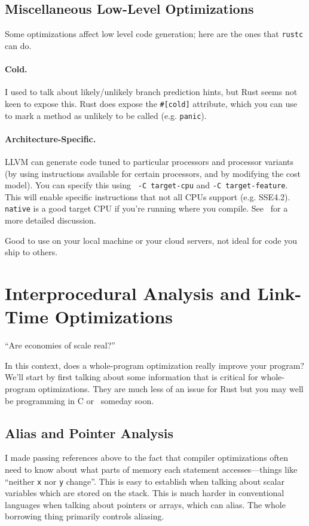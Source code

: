 \subsection*{Miscellaneous Low-Level Optimizations}
Some optimizations affect low level code generation; here are the ones that
{\tt rustc} can do.

\paragraph{Cold.} I used to talk about likely/unlikely branch prediction hints,
but Rust seems not keen to expose this. Rust does expose the \verb+#[cold]+
attribute, which you can use to mark a method as unlikely to be called (e.g. \texttt{panic}).

\paragraph{Architecture-Specific.} LLVM can generate code tuned to particular
processors and processor variants (by using instructions available for certain processors,
and by modifying the cost model). You can specify this using {\tt
  -C target-cpu} and {\tt -C target-feature}.
This will enable specific instructions that not all CPUs support (e.g. SSE4.2).
{\tt native} is a good target CPU if you're running where you compile.
See~\cite{wilcox20:_target_featur_target_cpu_rust}
for a more detailed discussion. 

\noindent
Good to use on your local machine or your cloud servers, not ideal for code you ship to others.


\section*{Interprocedural Analysis and Link-Time Optimizations}
\hfill ``Are economies of scale real?''

In this context, does a
whole-program optimization really improve your program?
We'll start by first talking about some information that is critical for
whole-program optimizations. They are much less of an issue for Rust but
you may well be programming in C or \CPP~someday soon.

\subsection*{Alias and Pointer Analysis}
I made passing references above to the fact that compiler optimizations often need
to know about what parts of memory each statement accesses---things like ``neither
{\tt x} nor {\tt y} change''. This is
easy to establish when talking about scalar variables which are stored on the
stack. This is much harder in conventional languages when talking about pointers or arrays, which can alias. The whole borrowing thing primarily controls aliasing.

